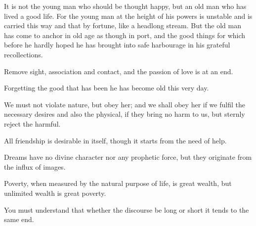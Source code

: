 \documentclass{stex}
\begin{document}
\vspace{0.5em}
\begin{sparagraph}[title=17]
  It is not the young man who should be thought happy, but an old man who has lived a good life.
  For the young man at the height of his powers is unstable and is carried this way and that by fortune, like a headlong stream.
  But the old man has come to anchor in old age as though in port, and the good things for which before he hardly hoped he has brought into safe harbourage in his grateful recollections.
\end{sparagraph}
\vspace{0.5em}
\begin{sparagraph}[title=18]
  Remove sight, association and contact, and the passion of love is at an end.
\end{sparagraph}
\vspace{0.5em}
\begin{sparagraph}[title=19]
  Forgetting the good that has been he has become old this very day.
\end{sparagraph}
\vspace{0.5em}
\begin{sparagraph}[title=21]
  We must not violate nature, but obey her; and we shall obey her if we fulfil the necessary desires and also the physical, if they bring no harm to us, but sternly reject the harmful.
\end{sparagraph}
\vspace{0.5em}
\begin{sparagraph}[title=23]
  All friendship is desirable in itself, though it starts from the need of help.
\end{sparagraph}
\vspace{0.5em}
\begin{sparagraph}[title=24]
  Dreams have no divine character nor any prophetic force, but they originate from the influx of images.
\end{sparagraph}
\vspace{0.5em}
\begin{sparagraph}[title=25]
  Poverty, when measured by the natural purpose of life, is great wealth, but unlimited wealth is great poverty.
\end{sparagraph}
\vspace{0.5em}
\begin{sparagraph}[title=26]
  You must understand that whether the discourse be long or short it tends to the same end.
\end{sparagraph}
\vspace{0.5em}
\end{document}
